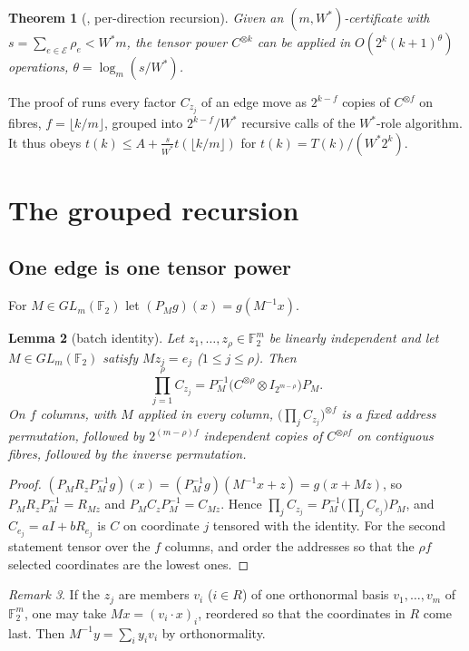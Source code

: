 \documentclass[11pt]{article}
\newtheorem{theorem}{Theorem}[section]
\newtheorem{lemma}[theorem]{Lemma}
\theoremstyle{definition}
\theoremstyle{remark}
\newtheorem{remark}[theorem]{Remark}
\newcommand{\F}{\mathbb{F}_2}
\newcommand{\E}{\mathcal{E}}
\begin{document}
\begin{theorem}[{\cite[Theorem~2.6]{oai}}, per-direction recursion]\label{thm:perdirection}
Given an $(m,W^*)$-certificate with $s=\sum_{e\in\E}\rho_e<W^*m$, the tensor power $C^{\otimes k}$ can be
applied in $O(2^k(k+1)^\theta)$ operations, $\theta=\log_m(s/W^*)$.
\end{theorem}

The proof of \cite{oai} runs every factor $C_{z_j}$ of an edge move as $2^{k-f}$ copies of
$C^{\otimes f}$ on fibres, $f=\lfloor k/m\rfloor$, grouped into $2^{k-f}/W^*$ recursive calls of the
$W^*$-role algorithm. It thus obeys $t(k)\le A+\frac{s}{W^*}t(\lfloor k/m\rfloor)$ for
$t(k)=T(k)/(W^*2^k)$.

\section{The grouped recursion}\label{sec:grouped}

\subsection{One edge is one tensor power}
For $M\in GL_m(\F)$ let $(P_Mg)(x)=g(M^{-1}x)$.

\begin{lemma}[batch identity]\label{lem:batch}
Let $z_1,\dots,z_\rho\in\F^m$ be linearly independent and let $M\in GL_m(\F)$ satisfy $Mz_j=e_j$
($1\le j\le\rho$). Then
\[
  \prod_{j=1}^\rho C_{z_j}=P_M^{-1}\big(C^{\otimes\rho}\otimes I_{2^{m-\rho}}\big)P_M .
\]
On $f$ columns, with $M$ applied in every column, $\big(\prod_jC_{z_j}\big)^{\otimes f}$ is a fixed
address permutation, followed by $2^{(m-\rho)f}$ independent copies of $C^{\otimes\rho f}$ on contiguous
fibres, followed by the inverse permutation.
\end{lemma}
\begin{proof}
$(P_MR_zP_M^{-1}g)(x)=(P_M^{-1}g)(M^{-1}x+z)=g(x+Mz)$, so $P_MR_zP_M^{-1}=R_{Mz}$ and
$P_MC_zP_M^{-1}=C_{Mz}$. Hence $\prod_jC_{z_j}=P_M^{-1}\big(\prod_jC_{e_j}\big)P_M$, and
$C_{e_j}=aI+bR_{e_j}$ is $C$ on coordinate $j$ tensored with the identity. For the second statement
tensor over the $f$ columns, and order the addresses so that the $\rho f$ selected coordinates are the
lowest ones.
\end{proof}

\begin{remark}
If the $z_j$ are members $v_i$ ($i\in R$) of one orthonormal basis $v_1,\dots,v_m$ of $\F^m$, one may
take $Mx=(v_i\cdot x)_i$, reordered so that the coordinates in $R$ come last. Then $M^{-1}y=\sum_iy_iv_i$
by orthonormality.
\end{remark}
\end{document}
